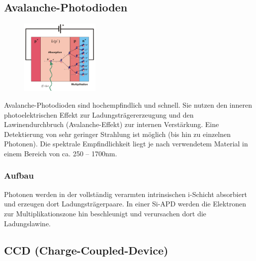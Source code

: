 \subsection{Avalanche-Photodioden}
\begin{figure}
    \vspace{-12pt}
    \centering
    \includegraphics[width=0.34\textwidth]{images/apd}
\end{figure}
Avalanche-Photodioden sind hochempfindlich und schnell. Sie nutzen den inneren photoelektrischen Effekt zur Ladungsträgererzeugung und den Lawinendurchbruch (Avalanche-Effekt) zur internen Verstärkung. Eine Detektierung von sehr geringer Strahlung ist möglich (bis hin zu einzelnen Photonen). Die spektrale Empfindlichkeit liegt je nach verwendetem Material in einem Bereich von ca. 250 – 1700nm.
\subsubsection{Aufbau}
Photonen werden in der vollständig verarmten intrinsischen i-Schicht absorbiert und erzeugen dort Ladungsträgerpaare. In einer Si-APD werden die Elektronen zur Multiplikationszone hin beschleunigt und verursachen dort die Ladungslawine.

\subsection{CCD (Charge-Coupled-Device)}

